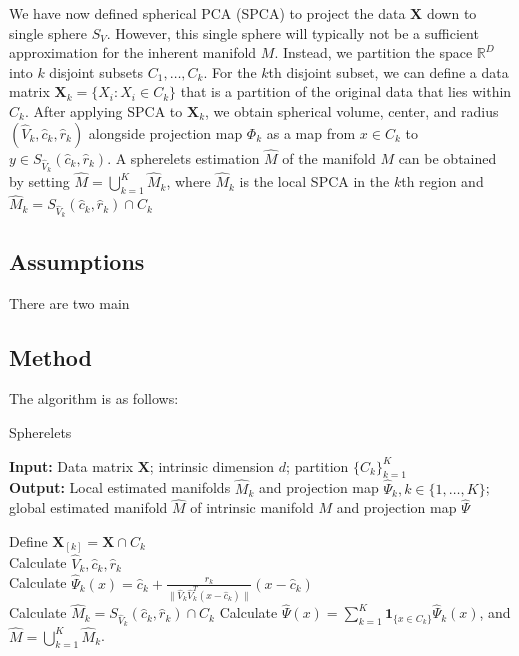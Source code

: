 \documentclass[]{article}
\begin{document}
We have now defined spherical PCA (SPCA) to project the data
\(\mathbf{X}\) down to single sphere \(S_V\). However, this single
sphere will typically not be a sufficient approximation for the inherent
manifold \(M\). Instead, we partition the space \(\mathbb{R}^D\) into
\(k\) disjoint subsets \(C_1, \dots, C_k\). For the \(k\)th disjoint
subset, we can define a data matrix
\(\mathbf{X}_k = \{X_i : X_i \in C_k\}\) that is a partition of the
original data that lies within \(C_k\). After applying SPCA to
\(\mathbf{X}_k\), we obtain spherical volume, center, and radius
\((\hat{V}_k, \hat{c}_k, \hat{r}_k)\) alongside projection map
\(\Phi_k\) as a map from \(x\in C_k\) to
\(y \in S_{\hat{V}_k}(\hat{c}_k, \hat{r}_k)\). A spherelets estimation
\(\hat{M}\) of the manifold \(M\) can be obtained by setting
\(\hat{M} = \bigcup_{k = 1}^K \hat{M}_k\), where \(\hat{M}_k\) is the
local SPCA in the \(k\)th region and
\(\hat{M}_k = S_{\hat{V}_k}(\hat{c}_k, \hat{r}_k) \cap C_k\)

\subsection{Assumptions}

There are two main

\subsection{Method}

The algorithm is as follows:

\begin{algorithm}[H]
  \caption{Spherelets}
  \textbf{Input:} Data matrix $\mathbf{X}$; intrinsic dimension $d$; partition $\{C_k\}_{k = 1}^K$ \\
  \textbf{Output:} Local estimated manifolds $\hat{M}_k$ and projection map $\hat{\Psi}_k, k \in \{1, \dots, K\}$; global estimated manifold $\hat{M}$ of intrinsic manifold $M$ and projection map $\hat{\Psi}$
  \begin{algorithmic}[1]
      \STATE Define $\mathbf{X}_{[k]} = \mathbf{X} \cap C_k$\; \\
      \STATE Calculate $\hat{V}_k, \hat{c}_k, \hat{r}_k$\; \\
      \STATE Calculate $\hat{\Psi}_k(x) = \hat{c}_k + \frac{\hat{r}_k}{\|\hat{V}_k\hat{V}_k^T(x-\hat{c}_k)\|}(x - \hat{c}_k)$\; \\
      \STATE Calculate $\hat{M}_k = S_{\hat{V}_k}(\hat{c}_k, \hat{r}_k) \cap C_k$\;
    \ENDFOR
    \STATE Calculate $\hat{\Psi}(x) = \sum_{k = 1}^K \mathbf{1}_{\{x \in C_k\}}\hat{\Psi}_k(x)$, and $\hat{M} = \bigcup_{k =1}^K\hat{M}_k$.
  \end{algorithmic}
\end{algorithm}
\end{document}
